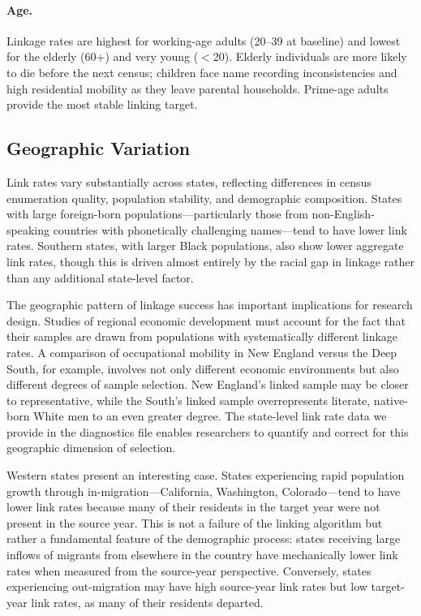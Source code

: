 \documentclass[12pt]{article}
\begin{document}
\paragraph{Age.} Linkage rates are highest for working-age adults (20--39 at baseline) and lowest for the elderly (60+) and very young ($<$20). Elderly individuals are more likely to die before the next census; children face name recording inconsistencies and high residential mobility as they leave parental households. Prime-age adults provide the most stable linking target.

\subsection{Geographic Variation}

Link rates vary substantially across states, reflecting differences in census enumeration quality, population stability, and demographic composition. States with large foreign-born populations---particularly those from non-English-speaking countries with phonetically challenging names---tend to have lower link rates. Southern states, with larger Black populations, also show lower aggregate link rates, though this is driven almost entirely by the racial gap in linkage rather than any additional state-level factor.

The geographic pattern of linkage success has important implications for research design. Studies of regional economic development must account for the fact that their samples are drawn from populations with systematically different linkage rates. A comparison of occupational mobility in New England versus the Deep South, for example, involves not only different economic environments but also different degrees of sample selection. New England's linked sample may be closer to representative, while the South's linked sample overrepresents literate, native-born White men to an even greater degree. The state-level link rate data we provide in the diagnostics file enables researchers to quantify and correct for this geographic dimension of selection.

Western states present an interesting case. States experiencing rapid population growth through in-migration---California, Washington, Colorado---tend to have lower link rates because many of their residents in the target year were not present in the source year. This is not a failure of the linking algorithm but rather a fundamental feature of the demographic process: states receiving large inflows of migrants from elsewhere in the country have mechanically lower link rates when measured from the source-year perspective. Conversely, states experiencing out-migration may have high source-year link rates but low target-year link rates, as many of their residents departed.
\end{document}
